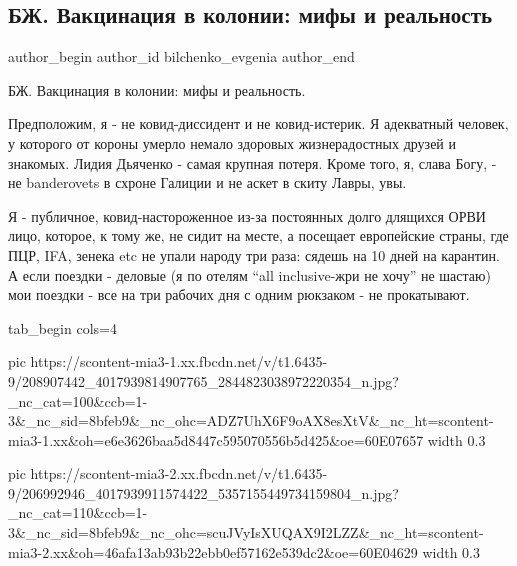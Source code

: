  
 
 
 
 
 
\subsection{БЖ. Вакцинация в колонии: мифы и реальность}
\label{sec:28_06_2021.fb.bilchenko_evgenia.1.vaccinacia_v_kolonii}
\ifcmt
 author_begin
   author_id bilchenko_evgenia
 author_end
\fi

БЖ. Вакцинация в колонии: мифы и реальность.

Предположим, я - не ковид-диссидент и не ковид-истерик. Я адекватный человек, у
которого от короны умерло немало здоровых жизнерадостных друзей и знакомых.
Лидия Дьяченко  - самая крупная потеря. Кроме того, я, слава Богу, -  не
banderovets в схроне Галиции и не аскет в скиту Лавры, увы. 

Я - публичное, ковид-настороженное из-за постоянных долго длящихся ОРВИ лицо,
которое, к тому же, не сидит на месте, а посещает европейские страны, где ПЦР,
IFA, зенека etc не упали народу три раза: сядешь на 10 дней на карантин. А если
поездки - деловые (я по отелям \enquote{all inclusive-жри не хочу} не шастаю) мои
поездки - все на три рабочих дня с одним рюкзаком - не прокатывают.

\ifcmt
  tab_begin cols=4

     pic https://scontent-mia3-1.xx.fbcdn.net/v/t1.6435-9/208907442_4017939814907765_2844823038972220354_n.jpg?_nc_cat=100&ccb=1-3&_nc_sid=8bfeb9&_nc_ohc=ADZ7UhX6F9oAX8esXtV&_nc_ht=scontent-mia3-1.xx&oh=e6e3626baa5d8447c595070556b5d425&oe=60E07657
     width 0.3

     pic https://scontent-mia3-2.xx.fbcdn.net/v/t1.6435-9/206992946_4017939911574422_5357155449734159804_n.jpg?_nc_cat=110&ccb=1-3&_nc_sid=8bfeb9&_nc_ohc=scuJVyIsXUQAX9I2LZZ&_nc_ht=scontent-mia3-2.xx&oh=46afa13ab93b22ebb0ef57162e539dc2&oe=60E04629
     width 0.3


